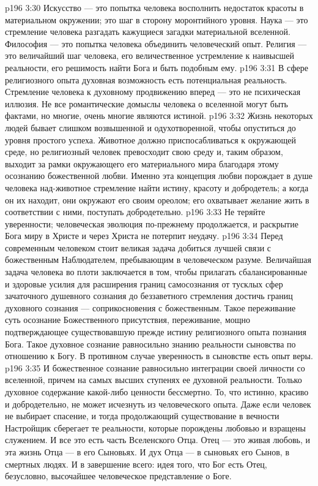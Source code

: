 \vs p196 3:30 \pc Искусство --- это попытка человека восполнить недостаток красоты в материальном окружении; это шаг в сторону моронтийного уровня. Наука --- это стремление человека разгадать кажущиеся загадки материальной вселенной. Философия --- это попытка человека объединить человеческий опыт. Религия --- это величайший шаг человека, его величественное устремление к наивысшей реальности, его решимость найти Бога и быть подобным ему.
\vs p196 3:31 \pc В сфере религиозного опыта духовная возможность есть потенциальная реальность. Стремление человека к духовному продвижению вперед --- это не психическая иллюзия. Не все романтические домыслы человека о вселенной могут быть фактами, но многие, очень многие являются истиной.
\vs p196 3:32 Жизнь некоторых людей бывает слишком возвышенной и одухотворенной, чтобы опуститься до уровня простого успеха. Животное должно приспосабливаться к окружающей среде, но религиозный человек превосходит свою среду и, таким образом, выходит за рамки окружающего его материального мира благодаря этому осознанию божественной любви. Именно эта концепция любви порождает в душе человека над\hyp{}животное стремление найти истину, красоту и добродетель; а когда он их находит, они окружают его своим ореолом; его охватывает желание жить в соответствии с ними, поступать добродетельно.
\vs p196 3:33 Не теряйте уверенности; человеческая эволюция по\hyp{}прежнему продолжается, и раскрытие Бога миру в Христе и через Христа не потерпит неудачу.
\vs p196 3:34 Перед современным человеком стоит великая задача добиться лучшей связи с божественным Наблюдателем, пребывающим в человеческом разуме. Величайшая задача человека во плоти заключается в том, чтобы прилагать сбалансированные и здоровые усилия для расширения границ самосознания от тусклых сфер зачаточного душевного сознания до беззаветного стремления достичь границ духовного сознания --- соприкосновения с божественным. Такое переживание суть осознание Божественного присутствия, переживание, мощно подтверждающее существовавшую прежде истину религиозного опыта познания Бога. Такое духовное сознание равносильно знанию реальности сыновства по отношению к Богу. В противном случае уверенность в сыновстве есть опыт веры.
\vs p196 3:35 И божественное сознание равносильно интеграции своей личности со вселенной, причем на самых высших ступенях ее духовной реальности. Только духовное содержание какой\hyp{}либо ценности бессмертно. То, что истинно, красиво и добродетельно, не может исчезнуть из человеческого опыта. Даже если человек не выбирает спасение, и тогда продолжающий существование в вечности Настройщик сберегает те реальности, которые порождены любовью и взращены служением. И все это есть часть Вселенского Отца. Отец --- это живая любовь, и эта жизнь Отца --- в его Сыновьях. И дух Отца --- в сыновьях его Сынов, в смертных людях. И в завершение всего: идея того, что Бог есть Отец, безусловно, высочайшее человеческое представление о Боге.
\separatorline
